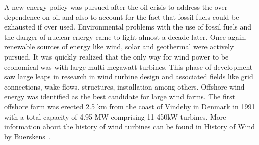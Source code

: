 A new energy policy was pursued after the oil crisis to address the over dependence on oil and also to account for the fact that fossil fuels could be exhausted if over used. Environmental problems with the use of fossil fuels and the danger of nuclear energy came to light almost a decade later. Once again, renewable sources of energy like wind, solar and geothermal were actively pursued. It was quickly realized that the only way for wind power to be economical was with large multi megawatt turbines. This phase of development saw large leaps in research in wind turbine design and associated fields like grid connections, wake flows, structures, installation among others. Offshore wind energy was identified as the best candidate for large wind farms. The first offshore farm was erected 2.5 km from the coast of Vindeby in Denmark in 1991 with a total capacity of 4.95 MW comprising 11 450kW turbines. 
More information about the history of wind turbines can be found in History of Wind by Buerskens~\cite{beurskens2014history}. 

